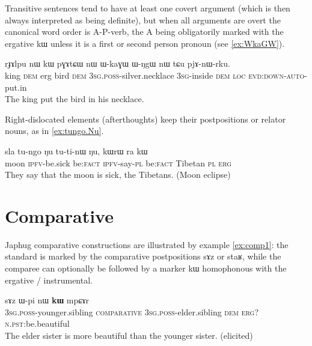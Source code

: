 \documentclass[oldfontcommands,oneside,a4paper,11pt]{article}
\newcommand{\ipa}[1]{{\phon #1}} %
\begin{document}
Transitive sentences tend to have at least one covert argument (which is then always interpreted as being definite), but when all arguments are overt the canonical word order is A-P-verb, the A being obligatorily marked with the ergative \ipa{kɯ} unless it is a first or second person pronoun (see \ref{ex:WkaGW}).

\begin{exe}
\ex \label{ex:WkaGW}
\gll
\ipa{rɟɤlpu} 	\ipa{nɯ} 	\ipa{kɯ} 	\ipa{pɣɤtɕɯ} 	\ipa{nɯ} 	\ipa{ɯ-kaɣɯ} 	\ipa{ɯ-ŋgɯ} 	\ipa{nɯ} 	\ipa{tɕu} 	\ipa{pjɤ-nɯ-rku.} \\
king \textsc{dem} erg bird \textsc{dem} \textsc{3sg.poss}-silver.necklace \textsc{3sg}-inside \textsc{dem} \textsc{loc} \textsc{evd:down-auto}-put.in \\
\glt The king put the bird in his necklace.
\end{exe}

Right-dislocated elements (afterthoughts) keep their postpositions or relator nouns, as in \ref{ex:tungo.Nu}.

\begin{exe}
\ex \label{ex:tungo.Nu}
\gll
\ipa{sla} 	\ipa{tu-ngo} 	\ipa{ŋu} 	\ipa{tu-ti-nɯ} 	\ipa{ŋu,} 	\ipa{kɯrɯ} 	\ipa{ra} 	\ipa{kɯ} \\
moon \textsc{ipfv}-be.sick  be:\textsc{fact} \textsc{ipfv}-say-\textsc{pl}  be:\textsc{fact}  Tibetan \textsc{pl} \textsc{erg} \\
\glt They say that the moon is sick, the Tibetans. (Moon eclipse)
\end{exe}

\section{Comparative}

Japhug comparative constructions are illustrated by example \ref{ex:comp1}: the standard is marked by the comparative postpositions \ipa{sɤz} or \ipa{staʁ}, while the comparee can optionally be followed by a marker \ipa{kɯ} homophonous with the ergative / instrumental.

\begin{exe}
\ex \label{ex:comp1}
\gll  \ipa{ɯ-ʁi}   	\ipa{sɤz}   	\ipa{ɯ-pi}   	\ipa{nɯ}   	\ipa{\textbf{kɯ}}   	\ipa{mpɕɤr}     \\
\textsc{3sg.poss}-younger.sibling \textsc{comparative} \textsc{3sg.poss}-elder.sibling \textsc{dem} \textsc{erg?}  \textsc{n.pst:}be.beautiful \\
\glt The elder sister is more beautiful than the younger sister. (elicited)
\end{exe}
\end{document}
